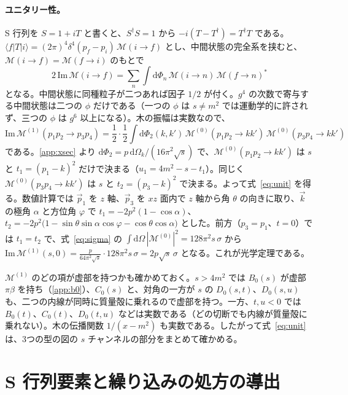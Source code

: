 \documentclass[a4paper,10pt]{ltjsarticle}
\newcommand{\dd}{\mathrm{d}}
\begin{document}
\paragraph{ユニタリー性。}S 行列を $S=1+iT$ と書くと、$S^\dagger S=1$ から $-i(T-T^\dagger)=T^\dagger T$ である。$\langle f|T|i\rangle=(2\pi)^4\delta^4(p_f-p_i)\,\mathcal{M}(i\to f)$ とし、中間状態の完全系を挟むと、$\mathcal{M}(i\to f)=\mathcal{M}(f\to i)$ のもとで
\begin{equation*}
2\,\mathrm{Im}\,\mathcal{M}(i\to f)=\sum_n\int\dd\Phi_n\,\mathcal{M}(i\to n)\,\mathcal{M}(f\to n)^*
\end{equation*}
となる。中間状態に同種粒子が二つあれば因子 $1/2$ が付く。$g^4$ の次数で寄与する中間状態は二つの $\phi$ だけである（一つの $\phi$ は $s\ne m^2$ では運動学的に許されず、三つの $\phi$ は $g^6$ 以上になる）。木の振幅は実数なので、
\begin{equation*}
\mathrm{Im}\,\mathcal{M}^{(1)}(p_1p_2\to p_3p_4)=\frac12\cdot\frac12\int\dd\Phi_2(k,k')\,\mathcal{M}^{(0)}(p_1p_2\to kk')\,\mathcal{M}^{(0)}(p_3p_4\to kk')
\end{equation*}
である。\ref{app:xsec} より $\dd\Phi_2=p\,\dd\Omega_k/(16\pi^2\sqrt s)$ で、$\mathcal{M}^{(0)}(p_1p_2\to kk')$ は $s$ と $t_1=(p_1-k)^2$ だけで決まる（$u_1=4m^2-s-t_1$）。同じく $\mathcal{M}^{(0)}(p_3p_4\to kk')$ は $s$ と $t_2=(p_3-k)^2$ で決まる。よって式~\eqref{eq:unit} を得る。数値計算では $\vec p_1$ を $z$ 軸、$\vec p_3$ を $xz$ 面内で $z$ 軸から角 $\theta$ の向きに取り、$\vec k$ の極角 $\alpha$ と方位角 $\varphi$ で $t_1=-2p^2(1-\cos\alpha)$、$t_2=-2p^2\bigl(1-\sin\theta\sin\alpha\cos\varphi-\cos\theta\cos\alpha\bigr)$ とした。前方（$p_3=p_1$、$t=0$）では $t_1=t_2$ で、式~\eqref{eq:sigma} の $\int\dd\Omega\,|\mathcal{M}^{(0)}|^2=128\pi^2s\,\sigma$ から $\mathrm{Im}\,\mathcal{M}^{(1)}(s,0)=\frac{p}{64\pi^2\sqrt s}\cdot128\pi^2s\,\sigma=2p\sqrt s\,\sigma$ となる。これが光学定理である。

$\mathcal{M}^{(1)}$ のどの項が虚部を持つかも確かめておく。$s>4m^2$ では $B_0(s)$ が虚部 $\pi\beta$ を持ち（\ref{app:b0}）、$C_0(s)$ と、対角の一方が $s$ の $D_0(s,t)$、$D_0(s,u)$ も、二つの内線が同時に質量殻に乗れるので虚部を持つ。一方、$t,u<0$ では $B_0(t)$、$C_0(t)$、$D_0(t,u)$ などは実数である（どの切断でも内線が質量殻に乗れない）。木の伝播関数 $1/(x-m^2)$ も実数である。したがって式~\eqref{eq:unit} は、3つの型の図の $s$ チャンネルの部分をまとめて確かめる。

\section{S 行列要素と繰り込みの処方の導出}\label{app:lsz}
\end{document}
